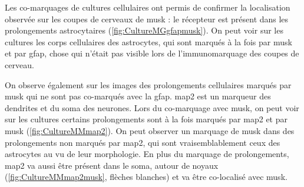 	Les co-marquages de cultures cellulaires ont permis de confirmer la localisation observée sur les coupes de cerveaux de \gls{musk} : le récepteur est présent dans les prolongements astrocytaires (\cref{fig:CultureMGgfapmusk}). On peut voir sur les cultures les corps cellulaires des astrocytes, qui sont marqués à la fois par \gls{musk} et par \gls{gfap}, chose qui n'était pas visible lors de l'immunomarquage des coupes de cerveau.
	
	On observe également sur les images des prolongements cellulaires marqués par \gls{musk} qui ne sont pas co-marqués avec la \gls{gfap}. \gls{map2} est un marqueur des dendrites et du soma des neurones. Lors du co-marquage avec \gls{musk}, on peut voir sur les cultures certains prolongements sont à la fois marqués par \gls{map2} et par \gls{musk} (\cref{fig:CultureMMmap2}). On peut observer un marquage de \gls{musk} dans des prolongements non marqués par \gls{map2}, qui sont vraisemblablement ceux des astrocytes au vu de leur morphologie. En plus du marquage de prolongements, \gls{map2} va aussi être présent  dans le soma, autour de noyaux (\cref{fig:CultureMMmap2musk}, flèches blanches) et va être co-localisé avec \gls{musk}. 
	
